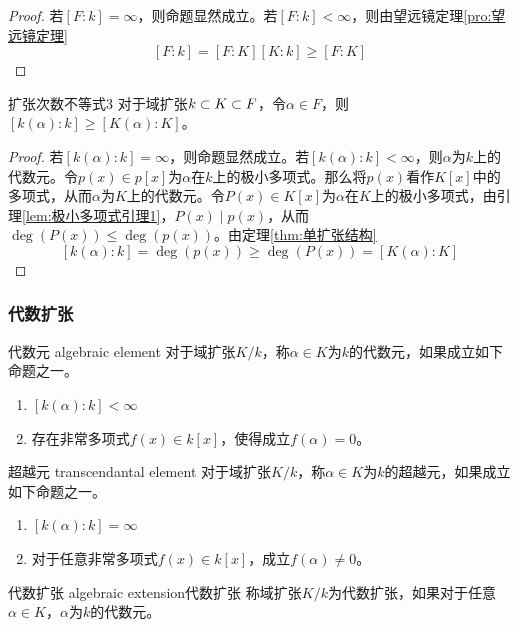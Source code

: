 \begin{proof}
	若$[F:k]=\infty$，则命题显然成立。若$[F:k]<\infty$，则由望远镜定理\ref{pro:望远镜定理}%
	$$
	[F:k]=[F:K][K:k]\ge [F:K]
	$$
\end{proof}

\begin{lemma}{}{扩张次数不等式3}
	对于域扩张$k\subset K\subset F$，令$\alpha\in F$，则$[k(\alpha):k]\ge [K(\alpha):K]$。
\end{lemma}

\begin{proof}
	若$[k(\alpha):k]=\infty$，则命题显然成立。若$[k(\alpha):k]<\infty$，则$\alpha$为$k$上的代数元。令$p(x)\in p[x]$为$\alpha$在$k$上的极小多项式。那么将$p(x)$看作$K[x]$中的多项式，从而$\alpha$为$K$上的代数元。令$P(x)\in K[x]$为$\alpha$在$K$上的极小多项式，由引理\ref{lem:极小多项式引理1}，$P(x)\mid p(x)$，从而$\deg(P(x))\le \deg(p(x))$。由定理\ref{thm:单扩张结构}%
	$$
	[k(\alpha):k]
	=\deg(p(x))
	\ge \deg(P(x))
	=[K(\alpha):K]
	$$
\end{proof}

\subsubsection{代数扩张}

\begin{definition}{代数元 algebraic element}
	对于域扩张$K/k$，称$\alpha\in K$为$k$的代数元，如果成立如下命题之一。
	\begin{enumerate}
		\item $[k(\alpha):k]<\infty$
		\item 存在非常多项式$f(x)\in k[x]$，使得成立$f(\alpha)=0$。
	\end{enumerate}
\end{definition}

\begin{definition}{超越元 transcendantal element}
	对于域扩张$K/k$，称$\alpha\in K$为$k$的超越元，如果成立如下命题之一。
	\begin{enumerate}
		\item $[k(\alpha):k]=\infty$
		\item 对于任意非常多项式$f(x)\in k[x]$，成立$f(\alpha)\ne 0$。
	\end{enumerate}
\end{definition}

\begin{definition}{代数扩张 algebraic extension}{代数扩张}
	称域扩张$K/k$为代数扩张，如果对于任意$\alpha\in K$，$\alpha$为$k$的代数元。
\end{definition}

